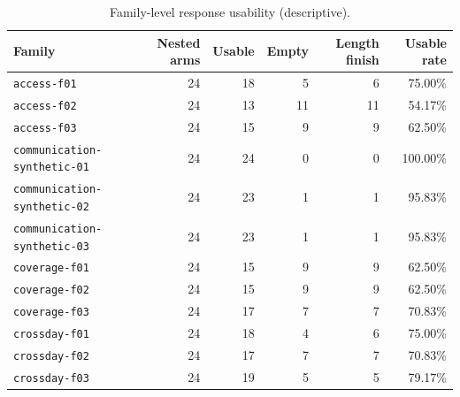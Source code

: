 \documentclass[11pt]{article}
\begin{document}
\begin{table}[h]
\centering
\caption{Family-level response usability (descriptive).}
\label{tab:family-usability}
\scriptsize
\begin{tabular}{lrrrrr}
\toprule
Family & Nested arms & Usable & Empty & Length finish & Usable rate \\
\midrule
\texttt{access-f01} & 24 & 18 & 5 & 6 & 75.00\% \\
\texttt{access-f02} & 24 & 13 & 11 & 11 & 54.17\% \\
\texttt{access-f03} & 24 & 15 & 9 & 9 & 62.50\% \\
\texttt{communication-synthetic-01} & 24 & 24 & 0 & 0 & 100.00\% \\
\texttt{communication-synthetic-02} & 24 & 23 & 1 & 1 & 95.83\% \\
\texttt{communication-synthetic-03} & 24 & 23 & 1 & 1 & 95.83\% \\
\texttt{coverage-f01} & 24 & 15 & 9 & 9 & 62.50\% \\
\texttt{coverage-f02} & 24 & 15 & 9 & 9 & 62.50\% \\
\texttt{coverage-f03} & 24 & 17 & 7 & 7 & 70.83\% \\
\texttt{crossday-f01} & 24 & 18 & 4 & 6 & 75.00\% \\
\texttt{crossday-f02} & 24 & 17 & 7 & 7 & 70.83\% \\
\texttt{crossday-f03} & 24 & 19 & 5 & 5 & 79.17\% \\
\bottomrule
\end{tabular}
\end{table}
\end{document}
